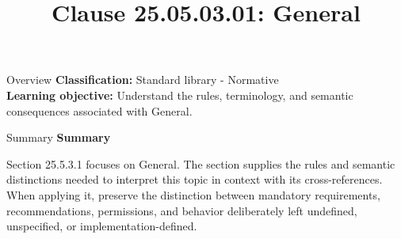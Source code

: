 \documentclass[10pt,letterpaper]{article}
\title{Clause 25.05.03.01: General}
\author{}
\date{}
\begin{document}
\maketitle
\begin{CornellOverviewBox}{Overview}
\textbf{Classification:} Standard library - Normative\\[2pt]
\textbf{Learning objective:} Understand the rules, terminology, and semantic consequences associated with General.
\end{CornellOverviewBox}\begin{CornellSummaryBox}{Summary}
{\sffamily\bfseries\color{Accent} Summary}\par\vspace{3pt}Section 25.5.3.1 focuses on General. The section supplies the rules and semantic distinctions needed to interpret this topic in context with its cross-references. When applying it, preserve the distinction between mandatory requirements, recommendations, permissions, and behavior deliberately left undefined, unspecified, or implementation-defined.
\end{CornellSummaryBox}
\end{document}
